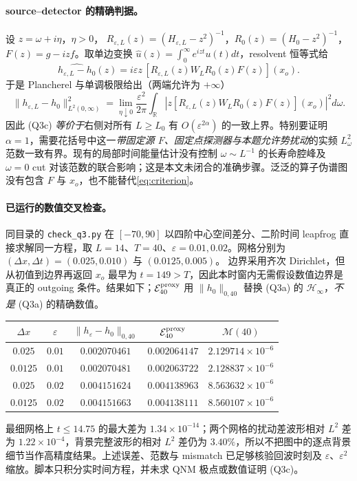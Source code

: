 \documentclass[UTF8,a4paper,11pt]{ctexart}
\newcommand{\ee}{\varepsilon}
\newcommand{\RR}{\mathbb R}
\newcommand{\HH}{\mathcal H}
\begin{document}
\paragraph{source--detector 的精确判据。}
设 $z=\omega+i\eta$，$\eta>0$，
$R_{\ee,L}(z)=(H_{\ee,L}-z^2)^{-1}$，$R_0(z)=(H_0-z^2)^{-1}$，
$F(z)=g-izf$。取单边变换 $\widehat u(z)=\int_0^\infty e^{izt}u(t)dt$，resolvent 恒等式给
\begin{equation}\label{eq:source}
 \widehat{h_{\ee,L}-h_0}(z)
 =i\ee z\,[R_{\ee,L}(z)W_LR_0(z)F(z)](x_o).
\end{equation}
于是 Plancherel 与单调极限给出（两端允许为 $+\infty$）
\begin{equation}\label{eq:criterion}
 \|h_{\ee,L}-h_0\|_{L^2(0,\infty)}^2
 =\lim_{\eta\downarrow0}\frac{\ee^2}{2\pi}
 \int_{\RR}\left|z[R_{\ee,L}(z)W_LR_0(z)F(z)](x_o)\right|^2d\omega.
\end{equation}
因此 (Q3c) \emph{等价于}右侧对所有 $L\geq L_0$ 有 $O(\ee^{2\alpha})$ 的一致上界。特别要证明 $\alpha=1$，需要花括号中这一\emph{带固定源 $F$、固定点探测器与本题允许势扰动}的实频 $L^2_\omega$ 范数一致有界。现有的局部时间能量估计没有控制 $\omega\sim L^{-1}$ 的长寿命腔峰及 $\omega=0$ cut 对该范数的联合影响；这是本文未闭合的准确步骤。泛泛的算子伪谱图没有包含 $F$ 与 $x_o$，也不能替代\eqref{eq:criterion}。

\paragraph{已运行的数值交叉检查。}
同目录的 \texttt{check\_q3.py} 在 $[-70,90]$ 以四阶中心空间差分、二阶时间 leapfrog 直接求解同一方程，取 $L=14$、$T=40$、$\ee=0.01,0.02$。网格分别为
$(\Delta x,\Delta t)=(0.025,0.010)$ 与 $(0.0125,0.005)$。
边界采用齐次 Dirichlet，但从初值到边界再返回 $x_o$ 最早为 $t=149>T$，因此本时窗内无需假设数值边界是真正的 outgoing 条件。结果如下；$\mathcal E_{40}^{\rm proxy}$ 用 $\|h_0\|_{0,40}$ 替换 (Q3a) 的 $\HH_\infty$，\emph{不是} (Q3a) 的精确数值。
\begin{center}
\begin{tabular}{@{}ccccc@{}}
\toprule
$\Delta x$ & $\ee$ & $\|h_\ee-h_0\|_{0,40}$ & $\mathcal E_{40}^{\rm proxy}$ & $\mathcal M(40)$\\
\midrule
$0.025$ & $0.01$ & $0.002070461$ & $0.002064147$ & $2.129714\times10^{-6}$\\
$0.0125$ & $0.01$ & $0.002070481$ & $0.002063722$ & $2.128837\times10^{-6}$\\
$0.025$ & $0.02$ & $0.004151624$ & $0.004138963$ & $8.563632\times10^{-6}$\\
$0.0125$ & $0.02$ & $0.004151663$ & $0.004138111$ & $8.560107\times10^{-6}$\\
\bottomrule
\end{tabular}
\end{center}
最细网格上 $t\leq14.75$ 的最大差为 $1.34\times10^{-14}$；两个网格的扰动差波形相对 $L^2$ 差为 $1.22\times10^{-4}$，背景完整波形的相对 $L^2$ 差仍为 $3.40\%$，所以不把图中的逐点背景细节当作高精度结果。上述误差、范数与 mismatch 已足够核验回波时刻及 $\ee$、$\ee^2$ 缩放。脚本只积分实时间方程，并未求 QNM 极点或数值证明 (Q3c)。
\end{document}
